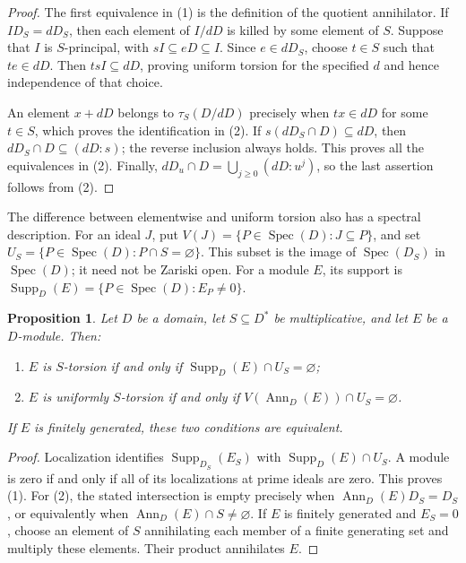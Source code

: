 \documentclass[11pt]{amsart}
\newtheorem{proposition}[theorem]{Proposition}
\theoremstyle{definition}
\theoremstyle{remark}
\DeclareMathOperator{\Spec}{Spec}
\DeclareMathOperator{\Ann}{Ann}
\DeclareMathOperator{\Supp}{Supp}
\begin{document}
\begin{proof}
The first equivalence in (1) is the definition of the quotient
annihilator. If $ID_S=dD_S$, then each element of $I/dD$ is killed
by some element of $S$. Suppose that $I$ is $S$-principal, with
$sI\subseteq eD\subseteq I$. Since $e\in dD_S$, choose $t\in S$
such that $te\in dD$. Then $tsI\subseteq dD$, proving uniform
torsion for the specified $d$ and hence independence of that choice.

An element $x+dD$ belongs to $\tau_S(D/dD)$ precisely when
$tx\in dD$ for some $t\in S$, which proves the identification in
(2). If $s(dD_S\cap D)\subseteq dD$, then
$dD_S\cap D\subseteq(dD:s)$; the reverse inclusion always holds.
This proves all the equivalences in (2). Finally,
$dD_u\cap D=\bigcup_{j\geq0}(dD:u^j)$, so the last assertion
follows from (2).
\end{proof}

The difference between elementwise and uniform torsion also has a
spectral description. For an ideal $J$, put
$V(J)=\{P\in\Spec(D):J\subseteq P\}$, and set
$U_S=\{P\in\Spec(D):P\cap S=\varnothing\}$.
This subset is the image of $\Spec(D_S)$ in $\Spec(D)$; it need
not be Zariski open. For a module $E$, its support is
$\Supp_D(E)=\{P\in\Spec(D):E_P\neq0\}$.

\begin{proposition}\label{p:annihilator-topology}
Let $D$ be a domain, let $S\subseteq D^\ast$ be multiplicative,
and let $E$ be a $D$-module. Then:
\begin{enumerate}
\item $E$ is $S$-torsion if and only if
$\Supp_D(E)\cap U_S=\varnothing$;
\item $E$ is uniformly $S$-torsion if and only if
$V(\Ann_D(E))\cap U_S=\varnothing$.
\end{enumerate}
If $E$ is finitely generated, these two conditions are equivalent.
\end{proposition}

\begin{proof}
Localization identifies $\Supp_{D_S}(E_S)$ with
$\Supp_D(E)\cap U_S$. A module is zero if and only if all of
its localizations at prime ideals are zero. This proves (1).
For (2), the stated intersection is empty precisely when
$\Ann_D(E)D_S=D_S$, or equivalently when
$\Ann_D(E)\cap S\neq\varnothing$.
If $E$ is finitely generated and $E_S=0$, choose an element of $S$
annihilating each member of a finite generating set and multiply
these elements. Their product annihilates $E$.
\end{proof}
\end{document}
